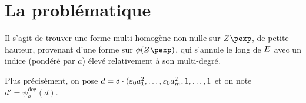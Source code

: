\documentclass{mpg-preth}
\begin{document}
\section{La problématique}

Il s'agit de trouver une forme multi-homogène non nulle sur $\var$, de petite
hauteur, provenant d'une forme sur $\phi(\var)$, qui s'annule le long de
$E$ avec un indice (pondéré par $a$) élevé relativement à son multi-degré.

Plus précisément, on pose $d = \delta \cdot (\varepsilon_0 a_1^2, \dots, \varepsilon_0
a_m^2, 1, \dots, 1$ et on note $d' = \psi_a^{\deg}(d)$.

\printbibliography
\end{document}
